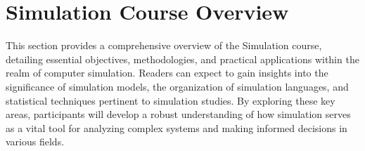 
\section{Simulation Course Overview}

This section provides a comprehensive overview of the Simulation course, detailing essential objectives, methodologies, and practical applications within the realm of computer simulation. Readers can expect to gain insights into the significance of simulation models, the organization of simulation languages, and statistical techniques pertinent to simulation studies. By exploring these key areas, participants will develop a robust understanding of how simulation serves as a vital tool for analyzing complex systems and making informed decisions in various fields.
